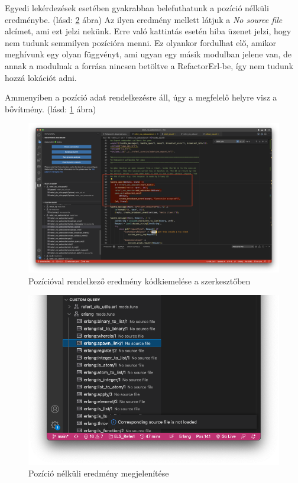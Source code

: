 Egyedi lekérdezések esetében gyakrabban belefuthatunk a pozíció nélküli eredménybe. (lásd: \ref{fig:nopos_res} ábra) Az ilyen eredmény mellett látjuk a \textit{No source file} alcímet, ami ezt jelzi nekünk. Erre való kattintás esetén hiba üzenet jelzi, hogy nem tudunk semmilyen pozícióra menni. Ez olyankor fordulhat elő, amikor meghívunk egy olyan függvényt, ami ugyan egy másik modulban jelene van, de annak a modulnak a forrása nincsen betöltve a RefactorErl-be, így nem tudunk hozzá lokációt adni.

Ammenyiben a pozíció adat rendelkezésre áll, úgy a megfelelő helyre visz a bővítmény. (lásd: \ref{fig:code_highligh} ábra)

\begin{figure}[H]
  \centering
  \includegraphics[width=\linewidth]{images/code_highlight.png}
  \caption{Pozícióval rendelkező eredmény kódkiemelése a szerkesztőben}
  \label{fig:code_highligh}
\end{figure}

\begin{figure}[H]
  \centering
  \includegraphics[width=\linewidth]{images/nopos.png}
  \caption{Pozíció nélküli eredmény megjelenítése}
  \label{fig:nopos_res}
\end{figure}



